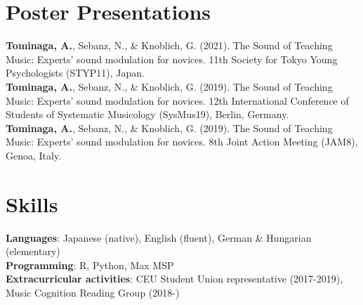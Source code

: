 \documentclass[letterpaper,11pt]{article}
\begin{document}
\section{Poster Presentations}
\begin{itemize}[leftmargin=0.15in, label={}]
   \small{\item{
    \textbf{Tominaga, A.}{, Sebanz, N., \& Knoblich, G. (2021). The Sound of Teaching Music: Experts’ sound modulation for novices. 11th Society for Tokyo Young Psychologists (STYP11), Japan.} \\
    \textbf{Tominaga, A.}{, Sebanz, N., \& Knoblich, G. (2019). The Sound of Teaching Music: Experts’ sound modulation for novices. 12th International Conference of Students of Systematic Musicology (SysMus19), Berlin, Germany.} \\
    \textbf{Tominaga, A.}{, Sebanz, N., \& Knoblich, G. (2019). The Sound of Teaching Music: Experts’ sound modulation for novices. 8th Joint Action Meeting (JAM8), Genoa, Italy.} \\
   }
   }
\end{itemize}

\section{Skills}
 \begin{itemize}[leftmargin=0.15in, label={}]
    \small{\item{
     \textbf{Languages}{: Japanese (native), English (fluent)}, German \& Hungarian (elementary) \\
     \textbf{Programming}{: R, Python, Max MSP} \\
     \textbf{Extracurricular activities}{: CEU Student Union representative (2017-2019)}, Music Cognition Reading Group (2018-)
    }
    }
 \end{itemize}


\end{document}
